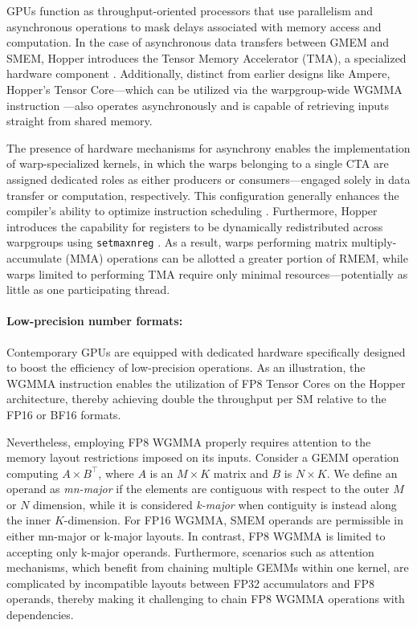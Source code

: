 \begin{enumerate}
GPUs function as throughput-oriented processors that use parallelism and asynchronous operations to mask delays associated with memory access and computation. In the case of asynchronous data transfers between GMEM and SMEM, Hopper introduces the Tensor Memory Accelerator (TMA), a specialized hardware component \cite[\S7.29]{cuda}. Additionally, distinct from earlier designs like Ampere, Hopper's Tensor Core—which can be utilized via the warpgroup-wide WGMMA instruction \cite[\S9.7.14]{ptx}—also operates asynchronously and is capable of retrieving inputs straight from shared memory.

The presence of hardware mechanisms for asynchrony enables the implementation of warp-specialized kernels, in which the warps belonging to a single CTA are assigned dedicated roles as either producers or consumers—engaged solely in data transfer or computation, respectively. This configuration generally enhances the compiler’s ability to optimize instruction scheduling \citep{warp-specialization-2011}. Furthermore, Hopper introduces the capability for registers to be dynamically redistributed across warpgroups using \verb|setmaxnreg| \cite[\S9.7.17.1]{ptx}. As a result, warps performing matrix multiply-accumulate (MMA) operations can be allotted a greater portion of RMEM, while warps limited to performing TMA require only minimal resources—potentially as little as one participating thread.

\paragraph{Low-precision number formats:}
\label{sec:low-precision-gpu}
Contemporary GPUs are equipped with dedicated hardware specifically designed to boost the efficiency of low-precision operations. As an illustration, the WGMMA instruction enables the utilization of FP8 Tensor Cores on the Hopper architecture, thereby achieving double the throughput per SM relative to the FP16 or BF16 formats.

Nevertheless, employing FP8 WGMMA properly requires attention to the memory layout restrictions imposed on its inputs. Consider a GEMM operation computing $A \times B^{\top}$, where $A$ is an $M\times K$ matrix and $B$ is $N\times K$. We define an operand as \emph{mn-major} if the elements are contiguous with respect to the outer $M$ or $N$ dimension, while it is considered \emph{k-major} when contiguity is instead along the inner $K$-dimension. For FP16 WGMMA, SMEM operands are permissible in either mn-major or k-major layouts. In contrast, FP8 WGMMA is limited to accepting only k-major operands. Furthermore, scenarios such as attention mechanisms, which benefit from chaining multiple GEMMs within one kernel, are complicated by incompatible layouts between FP32 accumulators and FP8 operands, thereby making it challenging to chain FP8 WGMMA operations with dependencies.


\end{enumerate}
